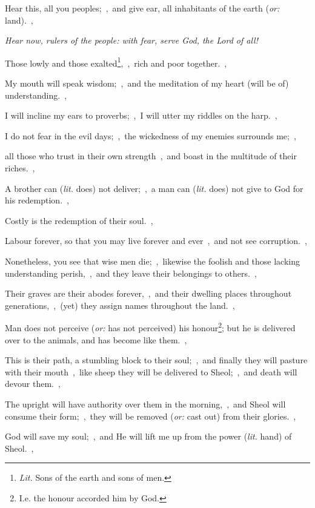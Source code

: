 \documentclass[12pt,twoside,a5paper]{article}
\newcommand{\qanona}[1]{{\liturgicalhint{Qanona.} \emph{#1}}}
\newcommand{\translationoption}[1]{\emph{or:} #1}
\newcommand{\translationliteral}[1]{\emph{lit.} #1}
\newcommand{\translationLiteral}[1]{\emph{Lit.} #1}
\begin{document}
\begin{normalparskip}
  Hear this, all you peoples;~\sep\ and give ear, all inhabitants of the earth (\translationoption{land}).~\sep

  \qanona{Hear now, rulers of the people: with fear, serve God, the Lord of all!}

  Those lowly and those exalted\footnote{\translationLiteral{Sons of the earth and sons of men.}},~\sep\ rich and poor together.~\sep

  My mouth will speak wisdom;~\sep\ and the meditation of my heart (will be of) understanding.~\sep

  I will incline my ears to proverbs;~\sep\ I will utter my riddles on the harp.~\sep

  I do not fear in the evil days;~\sep\ the wickedness of my enemies surrounds me;~\sep

  all those who trust in their own strength~\sep\ and boast in the multitude of their riches.~\sep

  A brother can (\translationliteral{does}) not deliver;~\sep\ a man can (\translationliteral{does}) not give to God for his redemption.~\sep

  Costly is the redemption of their soul.~\sep

  Labour forever, so that you may live forever and ever~\sep\ and not see corruption.~\sep

  Nonetheless, you see that wise men die;~\sep\ likewise the foolish and those lacking understanding perish,~\sep\ and they leave their belongings to others.~\sep

  Their graves are their abodes forever,~\sep\ and their dwelling places throughout generations,~\sep\ (yet) they assign names throughout the land.~\sep

  Man does not perceive (\translationoption{has not perceived}) his honour\footnote{I.e. the honour accorded him by God.}; but he is delivered over to the animals, and has become like them.~\sep

  This is their path, a stumbling block to their soul;~\sep\ and finally they will pasture with their mouth~\sep\ like sheep they will be delivered to Sheol;~\sep\ and death will devour them.~\sep

  The upright will have authority over them in the morning,~\sep\ and Sheol will consume their form;~\sep\ they will be removed (\translationoption{cast out}) from their glories.~\sep

  God will save my soul;~\sep\ and He will lift me up from the power (\translationliteral{hand}) of Sheol.~\sep


\end{normalparskip}
\end{document}
